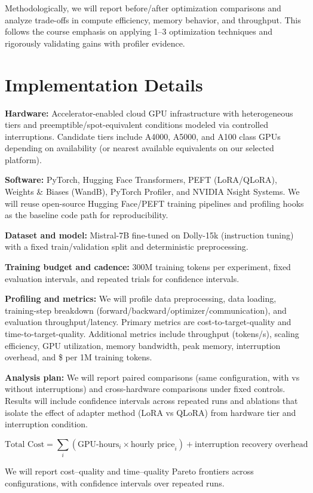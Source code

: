 \documentclass[10pt]{article}
\begin{document}
Methodologically, we will report before/after optimization comparisons and analyze trade-offs in compute efficiency, memory behavior, and throughput. This follows the course emphasis on applying 1--3 optimization techniques and rigorously validating gains with profiler evidence.

\section{Implementation Details}
\textbf{Hardware:} Accelerator-enabled cloud GPU infrastructure with heterogeneous tiers and preemptible/spot-equivalent conditions modeled via controlled interruptions. Candidate tiers include A4000, A5000, and A100 class GPUs depending on availability (or nearest available equivalents on our selected platform).

\textbf{Software:} PyTorch, Hugging Face Transformers, PEFT (LoRA/QLoRA), Weights \& Biases (WandB), PyTorch Profiler, and NVIDIA Nsight Systems. We will reuse open-source Hugging Face/PEFT training pipelines and profiling hooks as the baseline code path for reproducibility.

\textbf{Dataset and model:} Mistral-7B fine-tuned on Dolly-15k (instruction tuning) with a fixed train/validation split and deterministic preprocessing.

\textbf{Training budget and cadence:} 300M training tokens per experiment, fixed evaluation intervals, and repeated trials for confidence intervals.

\textbf{Profiling and metrics:} We will profile data preprocessing, data loading, training-step breakdown (forward/backward/optimizer/communication), and evaluation throughput/latency. Primary metrics are cost-to-target-quality and time-to-target-quality. Additional metrics include throughput (tokens/s), scaling efficiency, GPU utilization, memory bandwidth, peak memory, interruption overhead, and \$ per 1M training tokens.

\textbf{Analysis plan:} We will report paired comparisons (same configuration, with vs without interruptions) and cross-hardware comparisons under fixed controls. Results will include confidence intervals across repeated runs and ablations that isolate the effect of adapter method (LoRA vs QLoRA) from hardware tier and interruption condition.

\[
\text{Total Cost} = \sum_i (\text{GPU-hours}_i \times \text{hourly price}_i) + \text{interruption recovery overhead}
\]

We will report cost--quality and time--quality Pareto frontiers across configurations, with confidence intervals over repeated runs.
\end{document}
